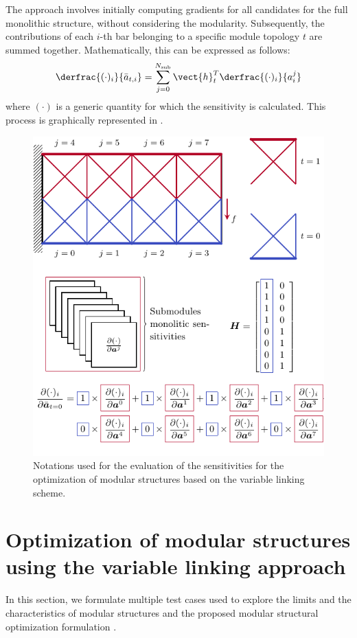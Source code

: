 The approach involves initially computing gradients for all candidates for the full monolithic structure, without considering the modularity. Subsequently, the contributions of each $i$-th bar belonging to a specific module topology $t$ are summed together. Mathematically, this can be expressed as follows:
\begin{equation}
    \derfrac{(\cdot)_i}{\bar{a}_{t,i}} =  \sum_{j=0}^{N_\text{sub}} \vect{h}_t^T \derfrac{(\cdot)_i}{a^j_i} 
    \label{eq:05_VL_grad}
\end{equation}
where $(\cdot)$ is a generic quantity for which the sensitivity is calculated. This process is graphically represented in .

\begin{figure}
    \centering
    \includegraphics{figures/05_cellular_opt/00_modules_VL_grad/modules_grad.pdf}
    \caption{Notations used for the evaluation of the sensitivities for the optimization of modular structures based on the variable linking scheme.}
    \label{fig:05_VL_grad}
\end{figure}

\section{Optimization of modular structures using the variable linking approach} \label{sec:05_02}
In this section, we formulate multiple test cases used to explore the limits and the characteristics of modular structures and the proposed modular structural optimization formulation .


